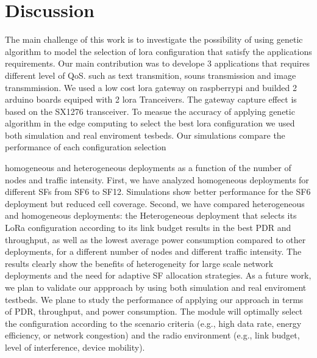 \section{Discussion} \label{sec:Conclusion}

The main challenge of this work is to investigate the possibility of using genetic algorithm to model the selection of lora configuration that satisfy the applications requirements.
Our main contribution was to develope 3 applications that requires different level of QoS.
such as text transmition, souns transmission and image transmmission. We used a low cost lora gateway on raspberrypi and builded 2 arduino boards equiped with 2 lora Tranceivers.
The gateway capture effect is based on the SX1276 transceiver.
To measue the accuracy of applying genetic algorithm in the edge computing to select the best lora configuration we used both simulation and real enviroment tesbeds.
Our simulations compare the performance of each configuration selection 


homogeneous and heterogeneous deployments as a function of the number of nodes and traffic intensity.
First,
	we have analyzed homogeneous deployments for different SFs from SF6 to SF12.
Simulations show better performance for the SF6 deployment but reduced cell coverage.
Second,
	we have compared heterogeneous and homogeneous deployments:
	the Heterogeneous deployment that selects its LoRa configuration according to its link budget results in the best PDR and throughput,
	as well as the lowest average power consumption compared to other deployments,
	for a different number of nodes and different traffic intensity.
The results clearly show the benefits of heterogeneity for large scale network deployments and the need for adaptive SF allocation strategies.
As a future work,
	we plan to validate our appproach by using both simulation and real enviroment testbeds. 
We plane to study the performance of applying our approach in terms of PDR,
	throughput,
	and power consumption.
The module will optimally select the configuration according to the scenario criteria (e.g.,
	high data rate,
	energy efficiency,
	or network congestion) and the radio environment (e.g.,
	link budget,
	level of interference,
	device mobility).
